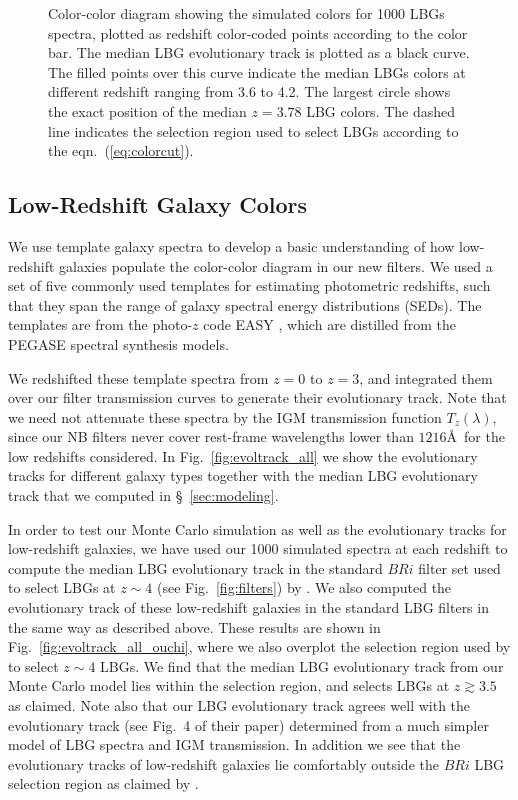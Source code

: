 \documentclass[iop, revtex4]{emulateapj}
\begin{document}
\begin{figure*}
\caption{Color-color diagram showing the simulated colors for 1000 LBGs spectra, plotted as redshift color-coded points according to the color bar. The median LBG evolutionary track is plotted as a black curve. The filled points over this curve indicate the median LBGs colors at different redshift ranging from 3.6 to 4.2. The largest circle shows the exact position of the median $z=3.78$ LBG colors. The dashed line indicates the selection region used to select LBGs according to the eqn.~(\ref{eq:colorcut}). \\} 
\label{fig:colors_yerr}
\end{figure*}

\subsection{Low-Redshift Galaxy Colors}
\label{sec:interlopers}

We use template galaxy spectra to develop a basic understanding of how low-redshift galaxies
populate the color-color diagram in our new filters. We used a set of five commonly used
templates for estimating photometric redshifts, such that they span
the range of galaxy spectral energy distributions (SEDs). The templates are from the
photo-$z$ code EASY \citep{Brammer08}, which are distilled from the PEGASE
spectral synthesis models.  

We redshifted these template spectra from $z=0$ to $z=3$, and
integrated them over our filter transmission curves to generate their
evolutionary track. Note that we need not attenuate these spectra by the IGM transmission function $T_{z}(\lambda)$, since our NB filters never cover rest-frame wavelengths lower than $1216$\AA\,
for the low redshifts considered.
In Fig.~\ref{fig:evoltrack_all} we show the evolutionary tracks for different galaxy types together with the median
LBG evolutionary track that we computed in \S~\ref{sec:modeling}. 

In order to test our Monte Carlo simulation as well as the
evolutionary tracks for low-redshift galaxies, we have used our 1000
simulated spectra at each redshift to compute the median LBG evolutionary track in the
standard $BRi$ filter set used to select LBGs at $z\sim 4$ (see Fig.~\ref{fig:filters})
by \citet{Ouchi04a}. We also computed the
evolutionary track of these low-redshift
galaxies in the standard LBG filters in the same way as described above. These results are shown in Fig.~\ref{fig:evoltrack_all_ouchi}, where we also overplot the selection
region used by \citet{Ouchi04a} to select $z\sim 4$ LBGs. We find that the
median  LBG evolutionary track from our Monte Carlo model lies within the \citet{Ouchi04a} selection region, and selects LBGs at $z\gtrsim 3.5$ as claimed. Note also that
our LBG evolutionary track agrees well with the \citet{Ouchi04a} evolutionary track
(see Fig.~4 of their paper) determined from a
much simpler model of LBG spectra and IGM transmission.
In addition we see that the evolutionary tracks of low-redshift galaxies lie comfortably
outside the $BRi$ LBG selection region as claimed by  \citet{Ouchi04a}.
\end{document}
